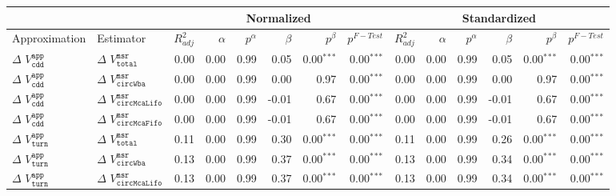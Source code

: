 \begin{tabular}{llrrrrrrrrrrrr}
   \hline \multicolumn{2}{l}{ } & \multicolumn{6}{c}{Normalized} & \multicolumn{6}{c}{Standardized} \\ \hline
Approximation & Estimator & $R^{2}_{adj}$ & $\alpha$ & $p^{\alpha}$ & $\beta$ & $p^{\beta}$ & $p^{F-Test}$ & $R^{2}_{adj}$ & $\alpha$ & $p^{\alpha}$ & $\beta$ & $p^{\beta}$ & $p^{F-Test}$ \\ 
   \hline
$\Delta$ $V^{\mathtt{app}}_{\mathtt{cdd}}$ & $\Delta$ $V^{\mathtt{msr}}_{\mathtt{total}}$ & 0.00 & 0.00 & 0.99 &  0.05 & 0.00\(^{\ast} \)\(^{\ast} \)\(^{\ast} \) & 0.00\(^{\ast} \)\(^{\ast} \)\(^{\ast} \) & 0.00 & 0.00 & 0.99 &  0.05 & 0.00\(^{\ast} \)\(^{\ast} \)\(^{\ast} \) & 0.00\(^{\ast} \)\(^{\ast} \)\(^{\ast} \) \\ 
  $\Delta$ $V^{\mathtt{app}}_{\mathtt{cdd}}$ & $\Delta$ $V^{\mathtt{msr}}_{\mathtt{circWba}}$ & 0.00 & 0.00 & 0.99 &  0.00 & 0.97 & 0.00\(^{\ast} \)\(^{\ast} \)\(^{\ast} \) & 0.00 & 0.00 & 0.99 &  0.00 & 0.97 & 0.00\(^{\ast} \)\(^{\ast} \)\(^{\ast} \) \\ 
  $\Delta$ $V^{\mathtt{app}}_{\mathtt{cdd}}$ & $\Delta$ $V^{\mathtt{msr}}_{\mathtt{circMcaLifo}}$ & 0.00 & 0.00 & 0.99 & -0.01 & 0.67 & 0.00\(^{\ast} \)\(^{\ast} \)\(^{\ast} \) & 0.00 & 0.00 & 0.99 & -0.01 & 0.67 & 0.00\(^{\ast} \)\(^{\ast} \)\(^{\ast} \) \\ 
  $\Delta$ $V^{\mathtt{app}}_{\mathtt{cdd}}$ & $\Delta$ $V^{\mathtt{msr}}_{\mathtt{circMcaFifo}}$ & 0.00 & 0.00 & 0.99 & -0.01 & 0.67 & 0.00\(^{\ast} \)\(^{\ast} \)\(^{\ast} \) & 0.00 & 0.00 & 0.99 & -0.01 & 0.67 & 0.00\(^{\ast} \)\(^{\ast} \)\(^{\ast} \) \\ 
   \hline
$\Delta$ $V^{\mathtt{app}}_{\mathtt{turn}}$ & $\Delta$ $V^{\mathtt{msr}}_{\mathtt{total}}$ & 0.11 & 0.00 & 0.99 &  0.30 & 0.00\(^{\ast} \)\(^{\ast} \)\(^{\ast} \) & 0.00\(^{\ast} \)\(^{\ast} \)\(^{\ast} \) & 0.11 & 0.00 & 0.99 &  0.26 & 0.00\(^{\ast} \)\(^{\ast} \)\(^{\ast} \) & 0.00\(^{\ast} \)\(^{\ast} \)\(^{\ast} \) \\ 
  $\Delta$ $V^{\mathtt{app}}_{\mathtt{turn}}$ & $\Delta$ $V^{\mathtt{msr}}_{\mathtt{circWba}}$ & 0.13 & 0.00 & 0.99 &  0.37 & 0.00\(^{\ast} \)\(^{\ast} \)\(^{\ast} \) & 0.00\(^{\ast} \)\(^{\ast} \)\(^{\ast} \) & 0.13 & 0.00 & 0.99 &  0.34 & 0.00\(^{\ast} \)\(^{\ast} \)\(^{\ast} \) & 0.00\(^{\ast} \)\(^{\ast} \)\(^{\ast} \) \\ 
  $\Delta$ $V^{\mathtt{app}}_{\mathtt{turn}}$ & $\Delta$ $V^{\mathtt{msr}}_{\mathtt{circMcaLifo}}$ & 0.13 & 0.00 & 0.99 &  0.37 & 0.00\(^{\ast} \)\(^{\ast} \)\(^{\ast} \) & 0.00\(^{\ast} \)\(^{\ast} \)\(^{\ast} \) & 0.13 & 0.00 & 0.99 &  0.34 & 0.00\(^{\ast} \)\(^{\ast} \)\(^{\ast} \) & 0.00\(^{\ast} \)\(^{\ast} \)\(^{\ast} \) \\ 

\end{tabular}
